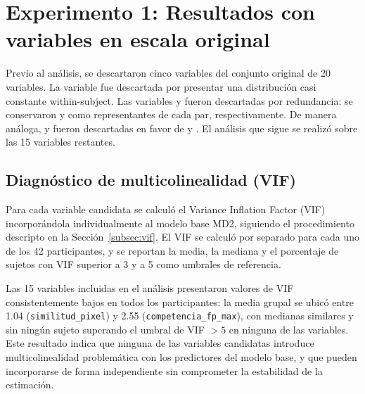 \section{Experimento 1: Resultados con variables en escala original}
\label{sec:resultados_features_original}

Previo al análisis, se descartaron cinco variables del conjunto 
original de 20 variables. La variable  
fue descartada por presentar una distribución casi constante 
within-subject. Las variables  
y  fueron descartadas por redundancia: 
se conservaron  y 
 como representantes de cada par, 
respectivamente. De manera análoga,  
y  fueron descartadas en favor de 
 y . El análisis 
que sigue se realizó sobre las 15 variables restantes.

\subsection{Diagnóstico de multicolinealidad (VIF)}

Para cada variable candidata se calculó el Variance Inflation 
Factor (VIF) incorporándola individualmente al modelo base MD2, 
siguiendo el procedimiento descripto en la Sección~\ref{subsec:vif}. 
El VIF se calculó por separado para cada uno de los 42 
participantes, y se reportan la media, la mediana y el porcentaje 
de sujetos con VIF superior a 3 y a 5 como umbrales de referencia.

Las 15 variables incluidas en el análisis presentaron valores de 
VIF consistentemente bajos en todos los participantes: la media 
grupal se ubicó entre 1.04 (\texttt{similitud\_pixel}) y 2.55 
(\texttt{competencia\_fp\_max}), con medianas similares y sin 
ningún sujeto superando el umbral de VIF $> 5$ en ninguna de 
las variables. Este resultado indica que ninguna de las variables 
candidatas introduce multicolinealidad problemática con los 
predictores del modelo base, y que pueden incorporarse de forma 
independiente sin comprometer la estabilidad de la estimación.

